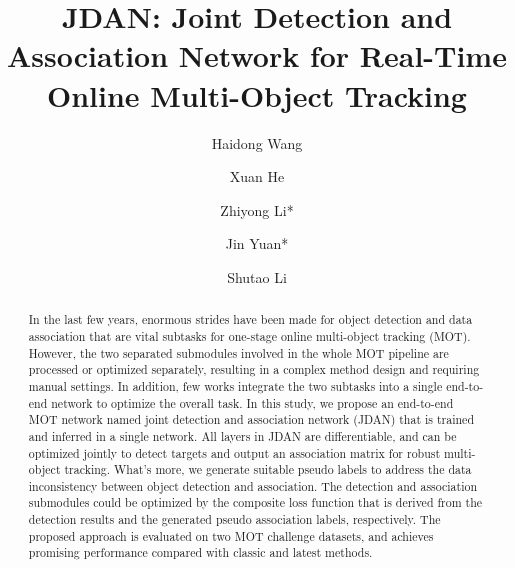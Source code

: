 \documentclass[acmsmall]{acmart}
\begin{document}
\title{JDAN: Joint Detection and Association Network for Real-Time Online Multi-Object Tracking}

\author{Haidong Wang}
\author{Xuan He}
\author{Zhiyong Li*}
\author{Jin Yuan*}
\author{Shutao Li}

\renewcommand{\shortauthors}{H. Wang and Z. Li, et al.}

\begin{abstract}
In the last few years, enormous strides have been made for object detection and data association that are vital subtasks for one-stage online multi-object tracking (MOT). 
However, the two separated submodules involved in the whole MOT pipeline are processed or optimized separately, resulting in a complex method design and requiring manual settings. 
In addition, few works integrate the two subtasks into a single end-to-end network to optimize the overall task. 
In this study, we propose an end-to-end MOT network named joint detection and association network (JDAN) that is trained and inferred in a single network. 
All layers in JDAN are differentiable, and can be optimized jointly to detect targets and output an {association} matrix for robust multi-object tracking. 
What's more, we generate suitable pseudo labels to address the data inconsistency between object detection and association. 
The detection and association submodules could be optimized by the composite loss function that is derived from the detection results and the generated pseudo association labels, respectively. 
The proposed approach is evaluated on two MOT challenge datasets, 
and achieves promising performance compared with classic and latest methods. 
\end{abstract}
\end{document}
